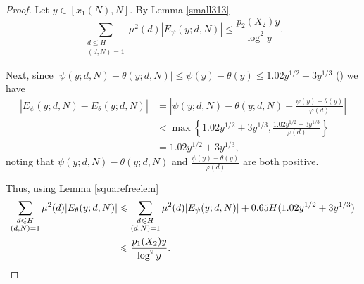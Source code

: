 \documentclass[12pt]{amsart}
\begin{document}
\begin{proof}
Let $y \in [x_1(N), N]$. By Lemma \ref{small313}
\begin{equation*}
    \sum_{\substack{d\le H\\(d,N)=1}}\mu^2(d)|E_{\psi}(y;d,N)| \le \frac{p_2(X_2)y}{\log^2 y}.
\end{equation*}

Next, since $|\psi(y; d,N) - \theta(y; d,N)| \le \psi(y)-\theta(y)\le 1.02y^{1/2}+3y^{1/3}$ (\cite[(3.39)]{R-S}) we have
\begin{align*}
    |E_{\psi}(y;d,N) - E_{\theta}(y;d,N)| &=\left|\psi(y;d,N)-\theta(y;d,N) - \frac{\psi(y) - \theta(y)}{\varphi(d)}\right|\\
    &<\max \left\{1.02y^{1/2}+3y^{1/3},\frac{1.02y^{1/2}+3y^{1/3}}{\varphi(d)}\right\}\\
    &=1.02y^{1/2}+3y^{1/3},
\end{align*}
noting that $\psi(y;d,N)-\theta(y;d,N)$ and $\frac{\psi(y) -\theta(y)}{\varphi(d)}$ are both positive.

Thus, using Lemma \ref{squarefreelem}
\begin{align}\label{p1psitheta}
    \sum_{\substack{d\le H\\(d,N)=1}}\mu^2(d)|E_{\theta}(y;d,N)|&\le\sum_{\substack{d\le H\\(d,N)=1}}\mu^2(d)|E_{\psi}(y;d,N)| + 0.65H(1.02y^{1/2}+3y^{1/3})\notag\\
    &\le\frac{p_1(X_2)y}{\log^2 y}.
\end{align}


\end{proof}
\end{document}

